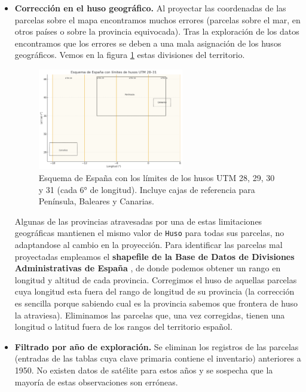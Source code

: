 \begin{itemize}
    \medskip
    
    \item \textbf{Corrección en el huso geográfico.} Al proyectar las coordenadas de las parcelas sobre el mapa encontramos muchos errores (parcelas sobre el mar, en otros países o sobre la provincia equivocada). Tras la exploración de los datos encontramos que los errores se deben a una mala asignación de los husos geográficos. Vemos en la figura \ref{fig:husos} estas divisiones del territorio. 
    \begin{figure}[H]
        \centering
        \includegraphics[width=0.6\textwidth]{figuras/husos.jpeg}
        \caption{\small Esquema de España con los límites de los husos UTM 28, 29, 30 y 31 (cada 6° de longitud). Incluye cajas de referencia para Península, Baleares y Canarias.}
        \label{fig:husos}
    \end{figure}
    
    Algunas de las provincias atravesadas por una de estas limitaciones geográficas mantienen el mismo valor de \texttt{Huso} para todas sus parcelas, no adaptandose al cambio en la proyección. Para identificar las parcelas mal proyectadas empleamos el \textbf{shapefile de la Base de Datos de Divisiones Administrativas de España} \cite{ign_shapefile}, de donde podemos obtener un rango en longitud y altitud de cada provincia. Corregimos el huso de aquellas parcelas cuya longitud esta fuera del rango de longitud de su provincia (la corrección es sencilla porque sabiendo cual es la provincia sabemos que frontera de huso la atraviesa). Eliminamos las parcelas que, una vez corregidas, tienen una longitud o latitud fuera de los rangos del territorio español. 

    \medskip

    \item \textbf{Filtrado por año de exploración.} Se eliminan los registros de las parcelas (entradas de las tablas cuya clave primaria contiene el inventario) anteriores a 1950. No existen datos de satélite para estos años y se sospecha que la mayoría de estas observaciones son erróneas. 


\end{itemize}

